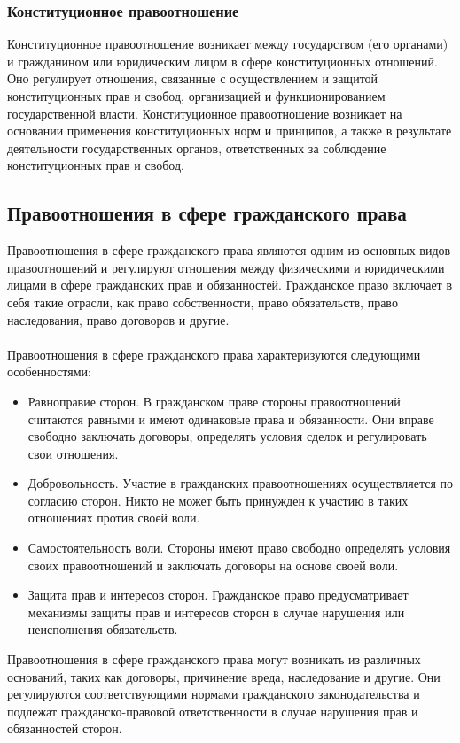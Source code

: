 \documentclass{article}
\begin{document}
\subsubsection{Конституционное правоотношение}
Конституционное правоотношение возникает между государством (его органами) и гражданином или юридическим лицом в сфере конституционных отношений. Оно регулирует отношения, связанные с осуществлением и защитой конституционных прав и свобод, организацией и функционированием государственной власти. Конституционное правоотношение возникает на основании применения конституционных норм и принципов, а также в результате деятельности государственных органов, ответственных за соблюдение конституционных прав и свобод.
\subsection{Правоотношения в сфере гражданского права}
Правоотношения в сфере гражданского права являются одним из основных видов правоотношений и регулируют отношения между физическими и юридическими лицами в сфере гражданских прав и обязанностей. Гражданское право включает в себя такие отрасли, как право собственности, право обязательств, право наследования, право договоров и другие.\\
~\\
Правоотношения в сфере гражданского права характеризуются следующими особенностями:
\begin{itemize}
\item Равноправие сторон. В гражданском праве стороны правоотношений считаются равными и имеют одинаковые права и обязанности. Они вправе свободно заключать договоры, определять условия сделок и регулировать свои отношения.
\item Добровольность. Участие в гражданских правоотношениях осуществляется по согласию сторон. Никто не может быть принужден к участию в таких отношениях против своей воли.
\item Самостоятельность воли. Стороны имеют право свободно определять условия своих правоотношений и заключать договоры на основе своей воли.
\item Защита прав и интересов сторон. Гражданское право предусматривает механизмы защиты прав и интересов сторон в случае нарушения или неисполнения обязательств.
\end{itemize}
Правоотношения в сфере гражданского права могут возникать из различных оснований, таких как договоры, причинение вреда, наследование и другие. Они регулируются соответствующими нормами гражданского законодательства и подлежат гражданско-правовой ответственности в случае нарушения прав и обязанностей сторон.\\
~\\
\end{document}
